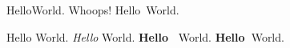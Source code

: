 \def\thello{Hello}
\thello World. Whoops! \thello\ World.\par
\thello{} World. {\it\thello} World. {\bf\thello\ } World. {\bf\thello\ }World.
\bye
